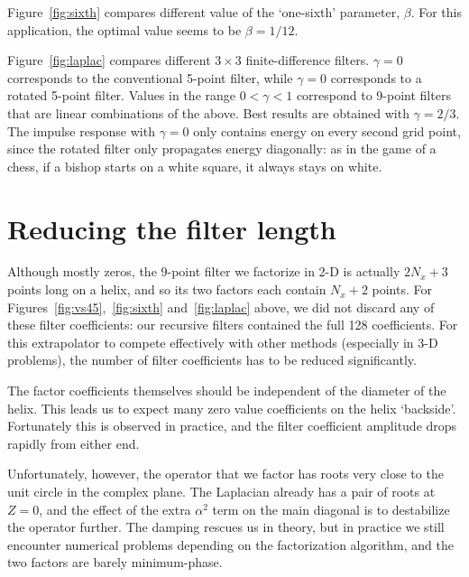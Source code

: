 \par
Figure~\ref{fig:sixth} compares different value of the `one-sixth'
parameter, $\beta$.  For this application, the optimal value seems to
be $\beta=1/12$.

\par
Figure~\ref{fig:laplac} compares different $3 \times 3$
finite-difference filters. $\gamma=0$ corresponds to the conventional
5-point filter, while $\gamma=0$ corresponds to a rotated 5-point
filter.  Values in the range $0 < \gamma < 1$ correspond to 9-point
filters that are linear combinations of the above.  Best results are
obtained with $\gamma = 2/3$.  The impulse response with $\gamma=0$
only contains energy on every second grid point, since the rotated
filter only propagates energy diagonally: as in the game of a chess,
if a bishop starts on a white square, it always stays on white.

\section{Reducing the filter length}
Although mostly zeros, the 9-point filter we factorize in 2-D 
is actually $2 N_x+3$ points long on a helix, and so its two
factors each contain $N_x+2$ points.
For Figures~\ref{fig:vs45},~\ref{fig:sixth} and~\ref{fig:laplac}
above, we did not discard any of these filter coefficients: 
our recursive filters contained the full 128 coefficients. 
For this extrapolator to compete effectively with other methods
(especially in 3-D problems), the number of filter coefficients has 
to be reduced significantly.

\par
The factor coefficients themselves should be independent of the
diameter of the helix. This leads us to expect many zero value
coefficients on the helix `backside'.  Fortunately this is observed in
practice, and the filter coefficient amplitude drops rapidly from
either end.

\par
Unfortunately, however, the operator that we factor has roots very
close to the unit circle in the complex plane. 
The Laplacian already has a pair of roots at $Z=0$, and the effect of
the extra $\alpha^2$ term on the main diagonal is to destabilize the
operator further.  The damping rescues us in theory, but in
practice we still encounter numerical problems depending on the
factorization algorithm, and the two factors are barely
minimum-phase.  

